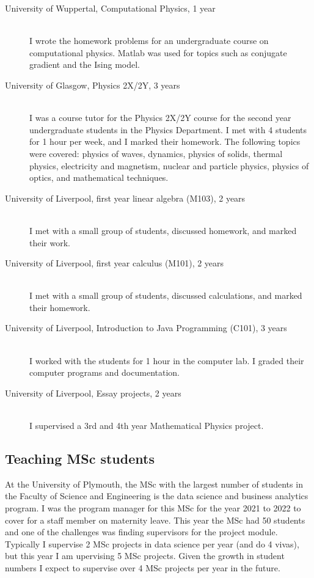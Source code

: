 \documentclass[12pt]{article}
\begin{document}
\begin{description}
  \item[University of Wuppertal, Computational Physics, 1 year] \hfill \\
I wrote
the homework problems for an 
undergraduate course on computational
physics. Matlab was used for topics such as conjugate gradient
and the Ising model.

  \item[University of Glasgow, Physics 2X/2Y, 3 years] \hfill \\
I was a course tutor for the Physics 2X/2Y course
for the second year undergraduate students
in the Physics Department. I met with 4 students for 1 hour per week,
and I marked their homework.
The following topics were covered:
physics of waves, dynamics, physics of solids, thermal physics,
electricity and magnetism, nuclear and particle physics, physics of
optics, and mathematical techniques.

\item[University of Liverpool, first year linear algebra
 (M103), 2 years] \hfill \\
I met with a small group of students, discussed homework,
and marked their work.

\item[University of Liverpool, first year calculus (M101), 2 years] \hfill \\
I met with a small group of students, discussed calculations,
and marked their homework.



\item[University of Liverpool, Introduction to Java Programming
 (C101), 3 years] \hfill \\
I worked with the students for 1 hour in the computer lab.
I graded their computer programs and documentation.



\item[University of Liverpool, Essay projects, 2 years] \hfill \\
I supervised a 3rd and 4th year Mathematical Physics project.

\end{description}

\subsection{Teaching MSc students}

At the University of Plymouth, the MSc with the largest
number of students in the Faculty of Science and Engineering
is the data science and business analytics program. I was the 
program manager for this MSc for the year 
2021 to 2022 to cover for a staff member
on maternity leave. This year the MSc had 50 students and one
of the challenges was finding supervisors for the project module.
Typically I supervise 2 MSc projects in data science per year (and do
4 vivas), but this year 
I am upervising 5 MSc projects. Given the growth in student numbers 
I expect to supervise over 4 MSc projects per year in the future.
\end{document}
